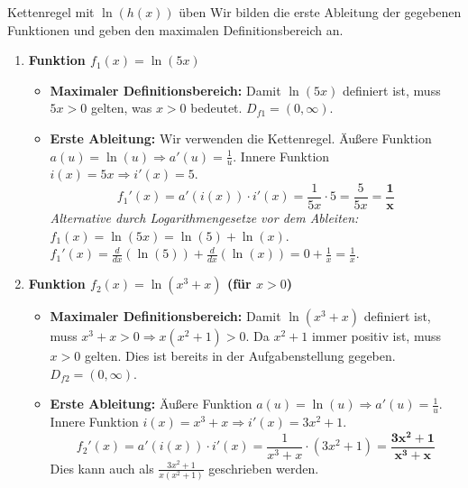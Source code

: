 \begin{loesungsumgebung}{Kettenregel mit \texorpdfstring{$\ln(h(x))$}{ln(h(x))} üben}
Wir bilden die erste Ableitung der gegebenen Funktionen und geben den maximalen Definitionsbereich an.

\begin{enumerate}[label=(\alph*)]
    \item \textbf{Funktion $f_1(x) = \ln(5x)$}
    \begin{itemize}
        \item \textbf{Maximaler Definitionsbereich:}
        Damit $\ln(5x)$ definiert ist, muss $5x > 0$ gelten, was $x > 0$ bedeutet.
        $D_{f1} = (0, \infty)$.
        \item \textbf{Erste Ableitung:}
        Wir verwenden die Kettenregel. Äußere Funktion $a(u) = \ln(u) \Rightarrow a'(u) = \frac{1}{u}$.
        Innere Funktion $i(x) = 5x \Rightarrow i'(x) = 5$.
        $$ f_1'(x) = a'(i(x)) \cdot i'(x) = \frac{1}{5x} \cdot 5 = \frac{5}{5x} = \mathbf{\frac{1}{x}} $$
        \textit{Alternative durch Logarithmengesetze vor dem Ableiten:}
        $f_1(x) = \ln(5x) = \ln(5) + \ln(x)$.
        $f_1'(x) = \frac{d}{dx}(\ln(5)) + \frac{d}{dx}(\ln(x)) = 0 + \frac{1}{x} = \frac{1}{x}$.
    \end{itemize}

    \item \textbf{Funktion $f_2(x) = \ln(x^3+x)$ (für $x>0$)}
    \begin{itemize}
        \item \textbf{Maximaler Definitionsbereich:}
        Damit $\ln(x^3+x)$ definiert ist, muss $x^3+x > 0 \Rightarrow x(x^2+1) > 0$.
        Da $x^2+1$ immer positiv ist, muss $x>0$ gelten. Dies ist bereits in der Aufgabenstellung gegeben.
        $D_{f2} = (0, \infty)$.
        \item \textbf{Erste Ableitung:}
        Äußere Funktion $a(u) = \ln(u) \Rightarrow a'(u) = \frac{1}{u}$.
        Innere Funktion $i(x) = x^3+x \Rightarrow i'(x) = 3x^2+1$.
        $$ f_2'(x) = a'(i(x)) \cdot i'(x) = \frac{1}{x^3+x} \cdot (3x^2+1) = \mathbf{\frac{3x^2+1}{x^3+x}} $$
        Dies kann auch als $\frac{3x^2+1}{x(x^2+1)}$ geschrieben werden.
    \end{itemize}


\end{enumerate}
\end{loesungsumgebung}
